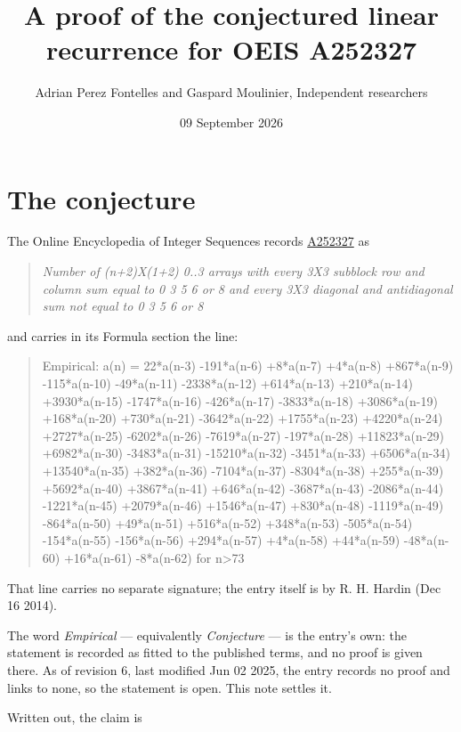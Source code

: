 \documentclass[11pt]{article}
\title{A proof of the conjectured linear recurrence for OEIS A252327}
\author{Adrian Perez Fontelles and Gaspard Moulinier, Independent researchers}
\date{09 September 2026}
\theoremstyle{definition}
\begin{document}
\maketitle
\section{The conjecture}

The Online Encyclopedia of Integer Sequences records \href{https://oeis.org/A252327}{A252327} as

\begin{quote}\itshape Number of (n+2)X(1+2) 0..3 arrays with every 3X3 subblock row and column sum equal to 0 3 5 6 or 8 and every 3X3 diagonal and antidiagonal sum not equal to 0 3 5 6 or 8\end{quote}

and carries in its Formula section the line:

\begin{quote}\ttfamily Empirical: a(n) = 22*a(n-3) -191*a(n-6) +8*a(n-7) +4*a(n-8) +867*a(n-9) -115*a(n-10) -49*a(n-11) -2338*a(n-12) +614*a(n-13) +210*a(n-14) +3930*a(n-15) -1747*a(n-16) -426*a(n-17) -3833*a(n-18) +3086*a(n-19) +168*a(n-20) +730*a(n-21) -3642*a(n-22) +1755*a(n-23) +4220*a(n-24) +2727*a(n-25) -6202*a(n-26) -7619*a(n-27) -197*a(n-28) +11823*a(n-29) +6982*a(n-30) -3483*a(n-31) -15210*a(n-32) -3451*a(n-33) +6506*a(n-34) +13540*a(n-35) +382*a(n-36) -7104*a(n-37) -8304*a(n-38) +255*a(n-39) +5692*a(n-40) +3867*a(n-41) +646*a(n-42) -3687*a(n-43) -2086*a(n-44) -1221*a(n-45) +2079*a(n-46) +1546*a(n-47) +830*a(n-48) -1119*a(n-49) -864*a(n-50) +49*a(n-51) +516*a(n-52) +348*a(n-53) -505*a(n-54) -154*a(n-55) -156*a(n-56) +294*a(n-57) +4*a(n-58) +44*a(n-59) -48*a(n-60) +16*a(n-61) -8*a(n-62) for n>73\end{quote}

That line carries no separate signature; the entry itself is by R. H. Hardin (Dec 16 2014).

The word {\itshape Empirical} --- equivalently {\itshape Conjecture} --- is the entry's own: the statement is recorded as fitted to the published terms, and no proof is given there. As of revision 6, last modified Jun 02 2025, the entry records no proof and links to none, so the statement is open. This note settles it.

Written out, the claim is
\end{document}
